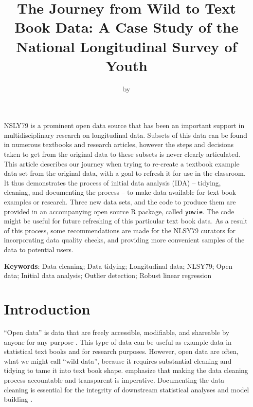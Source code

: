 \title{The Journey from Wild to Text Book Data: A Case Study of the National
Longitudinal Survey of Youth}
\author{by }

\maketitle


NSLY79 is a prominent open data source that has been an important
support in multidisciplinary research on longitudinal data. Subsets of
this data can be found in numerous textbooks and research articles,
however the steps and decisions taken to get from the original data to
these subsets is never clearly articulated. This article describes our
journey when trying to re-create a textbook example data set from the
original data, with a goal to refresh it for use in the classroom. It
thus demonstrates the process of initial data analysis (IDA) -- tidying,
cleaning, and documenting the process -- to make data available for text
book examples or research. Three new data sets, and the code to produce
them are provided in an accompanying open source R package, called
\texttt{yowie}. The code might be useful for future refreshing of this
particular text book data. As a result of this process, some
recommendations are made for the NLSY79 curators for incorporating data
quality checks, and providing more convenient samples of the data to
potential users.

\textbf{Keywords}: Data cleaning; Data tidying; Longitudinal data;
NLSY79; Open data; Initial data analysis; Outlier detection; Robust
linear regression

\hypertarget{introduction}{%
\section{Introduction}\label{introduction}}

``Open data'' is data that are freely accessible, modifiable, and
shareable by anyone for any purpose \citep{opendata}. This type of data
can be useful as example data in statistical text books and for research
purposes. However, open data are often, what we might call ``wild
data'', because it requires substantial cleaning and tidying to tame it
into text book shape. \citet{HuebnerMariannePhD2016Asat} emphasize that
making the data cleaning process accountable and transparent is
imperative. Documenting the data cleaning is essential for the integrity
of downstream statistical analyses and model building
\citep{HuebnerMarianne2020Haar}.

